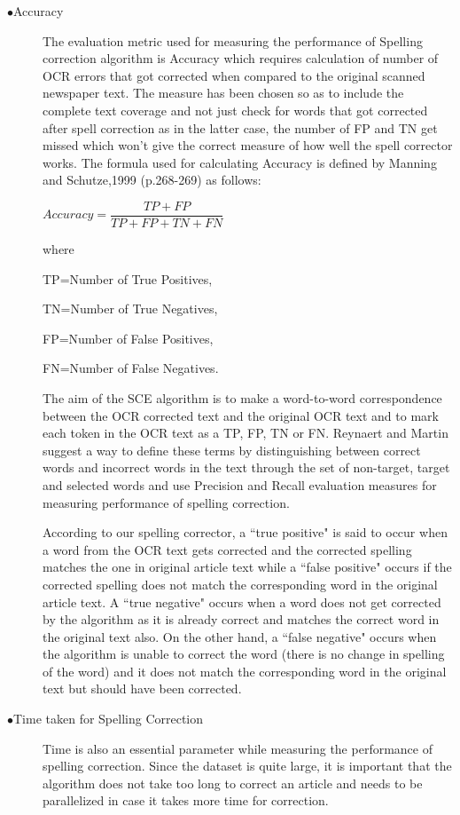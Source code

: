 \documentclass[letterpaper,11pt]{report}
\begin{document}
\begin{description}

 \item[$\bullet$Accuracy]
 The evaluation metric used for measuring the performance of Spelling correction algorithm is Accuracy which requires calculation of number of OCR errors that got corrected when compared to the original scanned newspaper text. The measure has been chosen so as to include the complete text coverage and not just check for words that got corrected after spell correction as in the latter case, the  number of FP and TN get missed which won't give the correct measure of how well the spell corrector works. The formula used for calculating Accuracy is defined by Manning and Schutze,1999 (p.268-269) as follows:

$Accuracy=  \dfrac{TP+FP} {TP+ FP + TN + FN}$


where 

TP=Number of True Positives,

TN=Number of True Negatives,

 FP=Number of False Positives,

 FN=Number of False Negatives. 

The aim of the SCE algorithm is to make a word-to-word correspondence between the OCR corrected text and the original OCR text and to mark each token in the OCR text as a TP, FP, TN or FN. Reynaert and Martin\cite{reynaert2008all} suggest a way to define these terms by distinguishing between correct words and incorrect words in the text through the set of non-target, target and selected words and use Precision and Recall evaluation measures for measuring performance of spelling correction. 

According to our spelling corrector, a ``true positive" is said to occur when a word from the OCR text gets corrected and the corrected spelling matches the one in original article text while a ``false positive" occurs if the corrected spelling does not match the corresponding word in the original article text. A ``true negative" occurs when a word does not get corrected by the algorithm as it is already correct and matches the correct word in the original text also. On the other hand, a ``false negative" occurs when the algorithm is unable to correct the word (there is no change in spelling of the word) and it does not match the corresponding word in the original text but should have been corrected.



\item[$\bullet$Time taken for Spelling Correction]
Time is also an essential parameter while measuring the performance of spelling correction. Since the dataset is quite large, it is important that the algorithm does not take too long to correct an article and needs to be parallelized in case it takes more time for correction.



\end{description}
\end{document}
